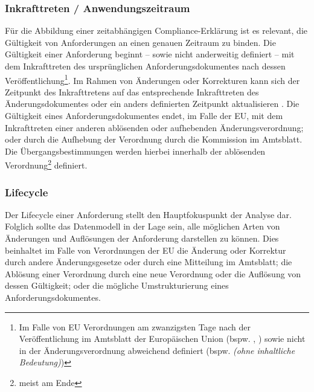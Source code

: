 
\subsubsection{Inkrafttreten / Anwendungszeitraum}

    Für die Abbildung einer zeitabhängigen Compliance-Erklärung ist es relevant, die Gültigkeit von Anforderungen an einen genauen Zeitraum zu binden.
    Die Gültigkeit einer Anforderung beginnt -- sowie nicht anderweitig definiert -- mit dem Inkrafttreten des ursprünglichen Anforderungsdokumentes nach dessen Veröffentlichung\footnote{Im Falle von EU Verordnungen am zwanzigsten Tage nach der Veröffentlichung im Amtsblatt der Europäischen Union (bspw. \cite[Art. 141]{2018R1139}, \cite[Art. 14]{2004R0549}) sowie nicht in der Änderungsverordnung abweichend definiert (bspw.  \textit{(ohne inhaltliche Bedeutung)})}.
    Im Rahmen von Änderungen oder Korrekturen kann sich der Zeitpunkt des Inkrafttretens auf das entsprechende Inkrafttreten des Änderungsdokumentes oder ein anders definierten Zeitpunkt  aktualisieren
    \cite{eu_consolidation}.
    Die Gültigkeit eines Anforderungsdokumentes endet, im Falle der \ac{EU}, mit dem Inkrafttreten einer anderen ablösenden oder aufhebenden Änderungsverordnung; oder durch die Aufhebung der Verordnung durch die Kommission im Amtsblatt. 
    Die Übergangsbestimmungen werden hierbei innerhalb der ablösenden Verordnung\footnote{meist am Ende} definiert.
    
\pagebreak

\subsubsection{Lifecycle}

    Der Lifecycle einer Anforderung stellt den Hauptfokuspunkt der Analyse dar. 
    Folglich sollte das Datenmodell in der Lage sein, alle möglichen Arten von Änderungen und Auflösungen der Anforderung darstellen zu können.
    Dies beinhaltet im Falle von Verordnungen der \ac{EU} die Änderung oder Korrektur durch andere Änderungsgesetze oder durch eine Mitteilung im Amtsblatt; die Ablösung einer Verordnung durch eine neue Verordnung oder die Auflösung von dessen Gültigkeit; oder die mögliche Umstrukturierung eines Anforderungsdokumentes.
    

